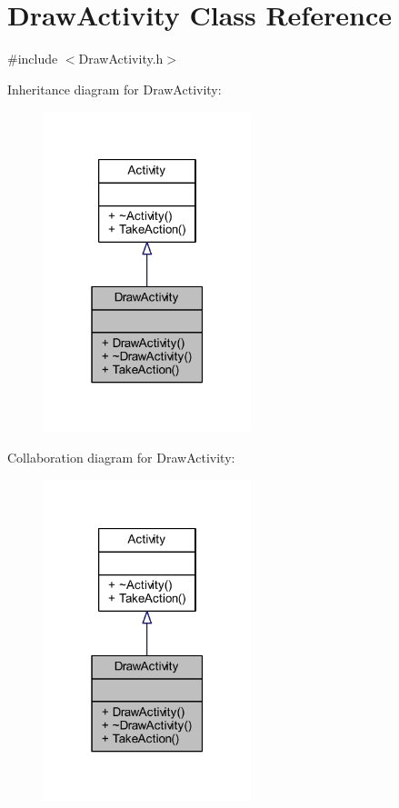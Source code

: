 \hypertarget{class_draw_activity}{}\section{Draw\+Activity Class Reference}
\label{class_draw_activity}


{\ttfamily \#include $<$Draw\+Activity.\+h$>$}



Inheritance diagram for Draw\+Activity\+:\nopagebreak
\begin{figure}[H]
\begin{center}
\leavevmode
\includegraphics[width=171pt]{class_draw_activity__inherit__graph}
\end{center}
\end{figure}


Collaboration diagram for Draw\+Activity\+:\nopagebreak
\begin{figure}[H]
\begin{center}
\leavevmode
\includegraphics[width=171pt]{class_draw_activity__coll__graph}
\end{center}
\end{figure}
